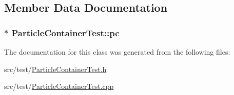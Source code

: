 \subsection{Member Data Documentation}
\hypertarget{classParticleContainerTest_abe422a5d5ec7ac984d1028f61ab85472}{
\subsubsection[{pc}]{$\ast$ Particle\+Container\+Test\+::pc\hspace{0.3cm}{\ttfamily [private]}}}\label{classParticleContainerTest_abe422a5d5ec7ac984d1028f61ab85472}


The documentation for this class was generated from the following files\+:\begin{DoxyCompactItemize}
\item 
src/test/\hyperlink{ParticleContainerTest_8h}{Particle\+Container\+Test.\+h}\item 
src/test/\hyperlink{ParticleContainerTest_8cpp}{Particle\+Container\+Test.\+cpp}\end{DoxyCompactItemize}
